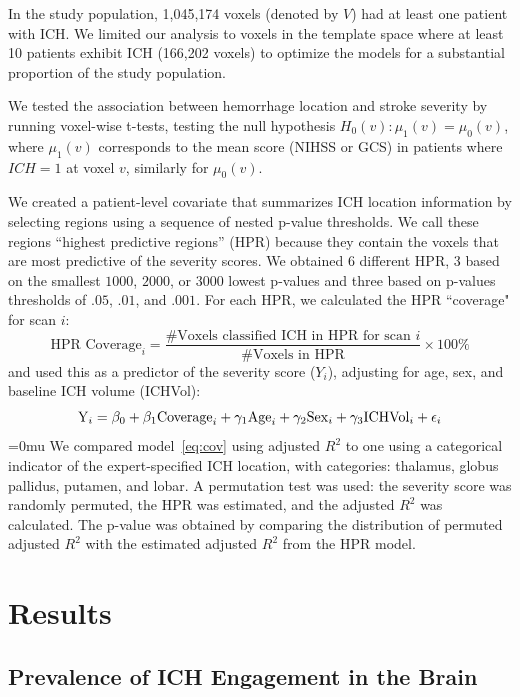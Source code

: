 \ifseverity
In the study population, 1,045,174 voxels (denoted by $V$) had at least one patient with ICH.  We limited our analysis to voxels in the template space where at least 10 patients exhibit ICH (166,202 voxels) to optimize the models for a substantial proportion of the study population.

We tested the association between hemorrhage location and stroke severity by running voxel-wise t-tests, testing the null hypothesis $H_{0}(v):\mu_{1}(v)=\mu_{0}(v)$, where $\mu_{1}(v)$ corresponds to the mean score (NIHSS or GCS) in patients where $ICH{=}1$ at voxel $v$, similarly for $\mu_{0}(v)$. 


We created a patient-level covariate that summarizes ICH location information by selecting regions using a sequence of nested p-value thresholds.  We call these regions ``highest predictive regions'' (HPR) because they contain the voxels that are most predictive of the severity scores. 
We obtained $6$ different HPR, $3$ based on the smallest $1000$, $2000$, or $3000$ lowest p-values and three based on p-values thresholds of $.05$, $.01$, and $.001$. For each HPR, we calculated the HPR ``coverage" for scan $i$: 
$$
\text{HPR Coverage}_i = \frac{\text{\# Voxels classified ICH in HPR for scan } i}{\text{\# Voxels in HPR}} \times 100\% \nonumber
$$
and used this as a predictor of the severity score ($Y_i$), adjusting for age, sex, and baseline ICH volume (ICHVol):
\begin{equation}
{\rm Y}_i = \beta_0 + \beta_1 {\rm Coverage}_i + \gamma_1{\rm Age}_i  +\gamma_2{\rm Sex}_i +\gamma_3{\rm ICHVol}_i + \epsilon_{i} \label{eq:cov}
\end{equation}
\thickmuskip=0mu
We compared model~\eqref{eq:cov} using adjusted $R^2$ to one using a categorical indicator of the expert-specified ICH location, with categories: thalamus, globus pallidus, putamen, and lobar.  
A permutation test was used: the severity score was randomly permuted, the HPR was estimated, and the adjusted $R^2$ was calculated. The p-value was obtained by comparing the distribution of permuted adjusted $R^2$ with the estimated adjusted $R^2$ from the HPR model. 
\fi
\section{Results}

\subsection{Prevalence of ICH Engagement in the Brain}

